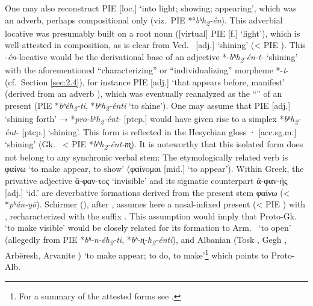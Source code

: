 \documentclass[output=paper,colorlinks,citecolor=brown]{langscibook}
\begin{document}
One may also reconstruct PIE  [loc.] ‘into light; showing; appearing’, which was an adverb, perhaps compositional only (viz.\ PIE *°\textit{bʰh\textsubscript{2}-én}). This adverbial locative was presumably  built on a root noun ([virtual] PIE  [f.] ‘light’), which is well-attested in composition, as is clear from Ved.\  [adj.] ‘shining’ (< PIE ). This -\textit{én}-locative  would be the derivational base of an adjective *-\textit{bʰh\textsubscript{2}-én-t}- ‘shining’ with the aforementioned “characterizing” or “individualizing” morpheme *-\textit{t}- (cf.\ Section \ref{sec:2.4}), for instance PIE   [adj.] ‘that appears before, manifest’ (derived from an adverb ), which was eventually reanalyzed as the “” of an  present  (PIE *\textit{bʰéh\textsubscript{2}-ti}, *\textit{bʰh\textsubscript{2}-énti}  ‘to shine’). One may assume that PIE  [adj.] ‘shining forth’ → *\textit{pro-bʰh\textsubscript{2}-ént}- [ptcp.] would have given rise to a simplex *\textit{bʰh\textsubscript{2}-ént}- [ptcp.] ‘shining’. This form is reflected in the Hesychian gloss ·  [acc.sg.m.] ‘shining’ (Gk.\  < PIE *\textit{bʰh\textsubscript{2}-ént-m̥}). It is noteworthy that this isolated form does not belong to any synchronic verbal stem: The etymologically related verb is φαίνω  ‘to make appear, to show’ (φαίνoμαι [mid.] ‘to appear’). Within Greek, the privative adjective ἄ-φαν-τoς  ‘invisible’ and its sigmatic counterpart ἀ-φαν-ής  [adj.] ‘id.’ are deverbative formations derived from the present stem φαίνω (< *\textit{pʰán-yō}). Schirmer (), after \citet[113]{Klingenschmitt1982}, assumes here a nasal-infixed present   (< PIE ) with , recharacterized with the suffix . This assumption would imply that Proto-Gk.\  ‘to make visible’ would be closely related for its formation to Arm.\  ‘to open’ (allegedly from PIE *\textit{bʰ-n-éh\textsubscript{2}-ti}, *\textit{bʰ-n̥-h\textsubscript{2}-énti}),  and Albanian (Tosk , Gegh , Arbëresh, Arvanite ) ‘to make appear; to do, to make’\footnote{For a summary of the attested forms see \citet{DemirajNeri2021}.} which points to Proto-Alb.\ 
\end{document}
